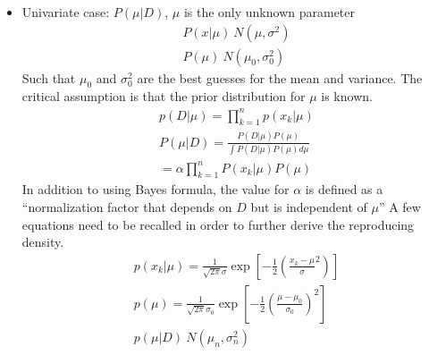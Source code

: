 \documentclass[11pt]{article}
\begin{document}
\begin{itemize}
	\item Univariate case: $P(\mu | D)$, $\mu$ is the only unknown parameter 
	\begin{eqnarray}
		P( x | \mu) ~ N( \mu , \sigma^2) \\
		P(\mu) ~ N( \mu_0 , \sigma_0^2 ) 
	\end{eqnarray}
	Such that $\mu_0$ and $\sigma_0 ^2$ are the best guesses for the mean and variance. The critical assumption is that the prior distribution for $\mu$ is known.  
	\begin{eqnarray}
		p(D | \mu) = \prod _{k=1}^n p(x_k | \mu) \\
		P(\mu | D) = \frac{P( D| \mu) P(\mu)}  {\int P(D | \mu) P(\mu) d\mu} \label{bayesNSamplesUnivariate}  \\
		= \alpha \prod _{k=1} ^n P( x_k | \mu) P(\mu) %
	\end{eqnarray}
	In addition to using Bayes formula, the value for $\alpha$ is defined as a ``normalization factor that depends on $D$ but is independent of $\mu$''  A few equations need to be recalled in order to further derive the reproducing density.
	\begin{eqnarray}
		p(x_k | \mu) = \frac{1} {\sqrt{2\pi} \sigma} \exp [ -\frac{1}{2}(\frac{x_k - \mu}{\sigma}^2) ]  \label{pxkmu-bayesian-parameter-estimation}\\
		p( \mu) = \frac{1}{\sqrt{2\pi} \sigma_0} \exp [-\frac{1}{2} ( \frac{\mu - \mu_0}{\sigma_0}) ^2]  \label{pmu-bayesian-parameter-estimation}\\
		p( \mu | D ) ~ N( \mu_n , \sigma_n ^2) \label{reproducingDensityUnivariate} 
	\end{eqnarray}
	

\end{itemize}
\end{document}
